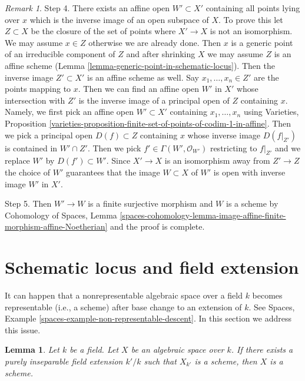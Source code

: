 \documentclass{stacks-project}
\theoremstyle{plain}
\newtheorem{lemma}[subsection]{Lemma}
\theoremstyle{definition}
\theoremstyle{remark}
\newtheorem{remark}[subsection]{Remark}
\numberwithin{equation}{subsection}
\begin{document}
\begin{remark}
\medskip\noindent
Step 4. There exists an affine open $W' \subset X'$ containing all points
lying over $x$ which is the inverse image of an open subspace of $X$.
To prove this let $Z \subset X$ be the closure of the set of points
where $X' \to X$ is not an isomorphism. We may assume $x \in Z$ otherwise
we are already done. Then $x$ is a generic point of an irreducible
component of $Z$ and after shrinking $X$ we may assume $Z$ is an affine scheme
(Lemma \ref{lemma-generic-point-in-schematic-locus}).
Then the inverse image $Z' \subset X'$ is an affine scheme as well.
Say $x_1, \ldots, x_n \in Z'$ are the points mapping to $x$.
Then we can find an affine open $W'$ in $X'$ whose intersection with
$Z'$ is the inverse image of a principal open of $Z$ containing $x$.
Namely, we first pick an affine open $W' \subset X'$ containing
$x_1, \ldots, x_n$ using Varieties, Proposition
\ref{varieties-proposition-finite-set-of-points-of-codim-1-in-affine}.
Then we pick a principal open $D(f) \subset Z$ containing $x$
whose inverse image $D(f|_{Z'})$ is contained in $W' \cap Z'$.
Then we pick $f' \in \Gamma(W', \mathcal{O}_{W'})$ restricting
to $f|_{Z'}$ and we replace $W'$ by $D(f') \subset W'$.
Since $X' \to X$ is an isomorphism away from $Z' \to Z$ the choice
of $W'$ guarantees that the image $W \subset X$ of $W'$ is open
with inverse image $W'$ in $X'$.

\medskip\noindent
Step 5. Then $W' \to W$ is a finite surjective morphism and $W$ is a scheme by
Cohomology of Spaces, Lemma
\ref{spaces-cohomology-lemma-image-affine-finite-morphism-affine-Noetherian}
and the proof is complete.
\end{remark}





\section{Schematic locus and field extension}
\label{section-schematic-and-field-extension}

\noindent
It can happen that a nonrepresentable algebraic space over a field $k$
becomes representable (i.e., a scheme) after base change to an extension
of $k$. See Spaces, Example \ref{spaces-example-non-representable-descent}.
In this section we address this issue.

\begin{lemma}
\label{lemma-scheme-after-purely-inseparable-base-change}
Let $k$ be a field. Let $X$ be an algebraic space over $k$.
If there exists a purely inseparable field extension $k'/k$
such that $X_{k'}$ is a scheme, then $X$ is a scheme.
\end{lemma}
\end{document}
